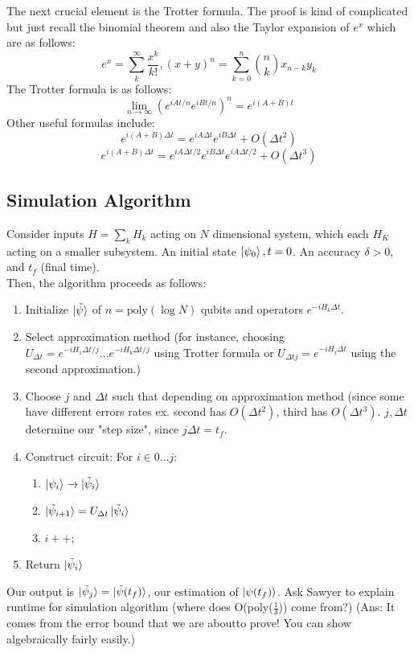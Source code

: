\documentclass{article}
\begin{document}
The next crucial element is the Trotter formula. The proof is kind of complicated but just recall the binomial theorem and also the Taylor expansion of $e^x$ which are as follows:
$$e^x = \sum_k^\infty \frac{x^k}{k!}, (x+y)^n = \sum^n_{k=0} \binom{n}{k} x_{n-k}y_k$$
The Trotter formula is as follows:
$$\lim_{n\to\infty} (e^{iAt/n} e^{iBt/n})^n = e^{i(A+B)t}$$
Other useful formulas include:
$$e^{i(A+B)\Delta t} = e^{iA \Delta t} e^{i B \Delta t} + O(\Delta t^2)$$
$$e^{i(A+B)\Delta t} = e^{i A \Delta t/2} e^{iB \Delta t}e^{iA \Delta t/2} + O(\Delta t^3)$$
\newpage
\subsection{Simulation Algorithm}
Consider inputs $H = \sum_k H_k$ acting on $N$ dimensional system, which each $H_K$ acting on a smaller subsystem. An initial state $\ket{\psi_0}, t=0$. An accuracy $\delta > 0$, and $t_f$ (final time).\\
Then, the algorithm proceeds as follows:
\begin{enumerate}
	\item Initialize $\ket{\tilde{\psi}}$ of $n = \text{poly}(\log N)$ qubits and operators $e^{-iH_k \Delta t}$. 
	\item Select approximation method (for instance, choosing $U_{\Delta t} = e^{-iH_1 \Delta t/j}\dots e^{-iH_k \Delta t/j} $ using Trotter formula or $U_{\Delta t j} = e^{-iH_j \Delta t}$ using the second approximation.)
	\item Choose $j$ and $\Delta t$ such that depending on approximation method (since some have different errors rates ex. second has $O(\Delta t^2)$, third has $O(\Delta t^3)$. $j, \Delta t$ determine our "step size", since $j \Delta t = t_f$. 

	\item Construct circuit: For $i \in 0\dots j$:
		\begin{enumerate}
			\item $ \ket{\psi_i} \to \ket{\tilde{\psi}_i}$
			\item $\ket{\tilde{\psi}_{i+1}} = U_{\Delta t} \ket{\tilde{\psi}_i}$
			\item $i++;$
		\end{enumerate}
	\item Return $\ket{\tilde{\psi}_i}$
\end{enumerate}
Our output is $\ket{\tilde{\psi}_j} = \ket{\tilde{\psi}(t_f)}$, our estimation of $\ket{\psi(t_f)}$.
Ask Sawyer to explain runtime for simulation algorithm (where does O(poly($\frac{1}{\delta}$)) come from?) (Ans: It comes from the error bound that we are aboutto prove! You can show algebraically fairly easily.)
\end{document}
